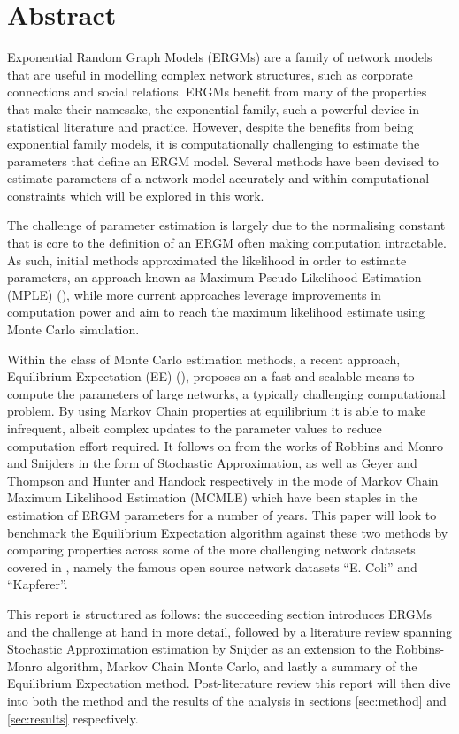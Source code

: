\section{Abstract}

Exponential Random Graph Models (ERGMs) are a family of network models that are useful in modelling complex network structures, such as corporate connections and social relations. ERGMs benefit from many of the properties that make their namesake, the exponential family, such a powerful device in statistical literature and practice. However, despite the benefits from being exponential family models, it is computationally challenging to estimate the parameters that define an ERGM model. Several methods have been devised to estimate parameters of a network model accurately and within computational constraints which will be explored in this work.

The challenge of parameter estimation is largely due to the normalising constant that is core to the definition of an ERGM often making computation intractable. As such, initial methods approximated the likelihood in order to estimate parameters, an approach known as Maximum Pseudo Likelihood Estimation (MPLE) (\cite{straussikeda1990}), while more current approaches leverage improvements in computation power and aim to reach the maximum likelihood estimate using Monte Carlo simulation. 

Within the class of Monte Carlo estimation methods, a recent approach, Equilibrium Expectation (EE) (\cite{eqexpectation}), proposes an a fast and scalable means to compute the parameters of large networks, a typically challenging computational problem. By using Markov Chain properties at equilibrium it is able to make infrequent, albeit complex updates to the parameter values to reduce computation effort required. It follows on from the works of Robbins and Monro and Snijders in the form of Stochastic Approximation, as well as Geyer and Thompson and Hunter and Handock respectively in the mode of Markov Chain Maximum Likelihood Estimation (MCMLE) which have been staples in the estimation of ERGM parameters for a number of years. This paper will look to benchmark the Equilibrium Expectation algorithm against these two methods by comparing properties across some of the more challenging network datasets covered in \cite{hummels2012}, namely the famous open source network datasets ``E. Coli'' and ``Kapferer''. 

This report is structured as follows: the succeeding section introduces ERGMs and the challenge at hand in more detail, followed by a literature review spanning Stochastic Approximation estimation by Snijder as an extension to the Robbins-Monro algorithm, Markov Chain Monte Carlo, and lastly a summary of the Equilibrium Expectation method. Post-literature review this report will then dive into both the method and the results of the analysis in sections \ref{sec:method} and \ref{sec:results} respectively.
